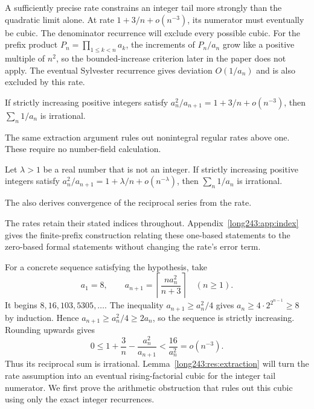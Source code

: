 \documentclass[11pt]{article}
\begin{document}
A sufficiently precise rate constrains an integer tail more strongly
than the quadratic limit alone. At rate $1+3/n+o(n^{-3})$, its
numerator must eventually be cubic. The denominator recurrence will
exclude every possible cubic. For the prefix product
$P_n=\prod_{1\le k<n}a_k$, the increments of $P_n/a_n$ grow like a
positive multiple of $n^2$, so the bounded-increase criterion
later in the paper does not apply. The eventual Sylvester recurrence gives deviation
$O(1/a_n)$ and is also excluded by this rate.

\begin{theorem}\label{long243:res:cubicrate}
If strictly increasing positive integers satisfy
$a_n^2/a_{n+1}=1+3/n+o(n^{-3})$, then $\sum_n1/a_n$ is irrational.
\end{theorem}

The same extraction argument rules out nonintegral regular rates above
one. These require no number-field calculation.

\begin{theorem}\label{long243:res:nonintegralrate}
Let $\lambda>1$ be a real number that is not an integer. If strictly
increasing positive integers satisfy
$a_n^2/a_{n+1}=1+\lambda/n+o(n^{-\lambda})$, then
$\sum_n1/a_n$ is irrational.
\end{theorem}

The 
also derives convergence of the reciprocal series from the rate.


The rates retain their stated indices throughout. Appendix~\ref{long243:app:index}
gives the finite-prefix construction relating these one-based statements
to the zero-based formal statements without changing the rate's error term.

For a concrete sequence satisfying the hypothesis, take
\[
 a_1=8,\qquad a_{n+1}=\left\lceil\frac{n a_n^2}{n+3}\right\rceil
 \quad(n\ge1).
\]
It begins $8,16,103,5305,\ldots$. The inequality $a_{n+1}\ge a_n^2/4$
gives $a_n\ge4\cdot2^{2^{n-1}}\ge8$ by induction. Hence
$a_{n+1}\ge a_n^2/4\ge2a_n$, so the sequence is strictly increasing.
Rounding upwards gives
\[
 0\le1+\frac3n-\frac{a_n^2}{a_{n+1}}<\frac{16}{a_n^2}=o(n^{-3}).
\]
Thus its reciprocal sum is irrational. Lemma~\ref{long243:res:extraction}
will turn the rate assumption into an eventual rising-factorial cubic
for the integer tail numerator. We first prove the arithmetic obstruction
that rules out this cubic using only the exact integer recurrences.
\end{document}
